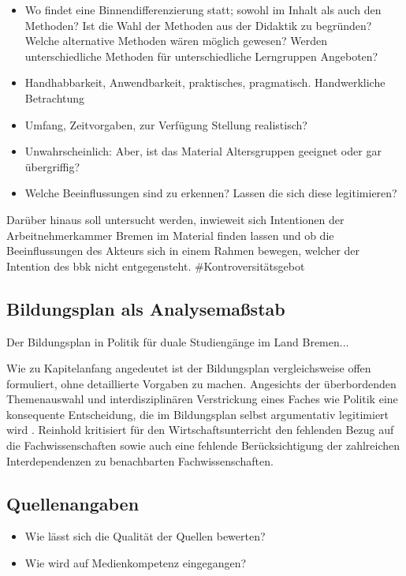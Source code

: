 \begin{itemize}
    \item Wo findet eine Binnendifferenzierung statt; sowohl im Inhalt als auch den Methoden? Ist die Wahl der Methoden aus der Didaktik zu begründen? Welche alternative Methoden wären möglich gewesen? Werden unterschiedliche Methoden für unterschiedliche Lerngruppen Angeboten?
    \item Handhabbarkeit, Anwendbarkeit, praktisches, pragmatisch. Handwerkliche Betrachtung
    \item Umfang, Zeitvorgaben, zur Verfügung Stellung realistisch?
    \item Unwahrscheinlich: Aber, ist das Material Altersgruppen geeignet oder gar übergriffig?
    \item Welche Beeinflussungen sind zu erkennen? Lassen die sich diese legitimieren?
\end{itemize}
Darüber hinaus soll untersucht werden, inwieweit sich Intentionen der Arbeitnehmerkammer Bremen im Material finden lassen und ob die Beeinflussungen des Akteurs sich in einem Rahmen bewegen, welcher der Intention des \gls{bbk} nicht entgegensteht. \#Kontroversitätsgebot 


\subsection{Bildungsplan als Analysemaßstab}
Der Bildungsplan \autocite{bplan} in Politik für duale Studiengänge im Land Bremen...

Wie zu Kapitelanfang angedeutet ist der Bildungsplan vergleichsweise offen formuliert, ohne detaillierte Vorgaben zu machen. Angesichts der überbordenden Themenauswahl und interdisziplinären Verstrickung eines Faches wie Politik eine konsequente Entscheidung, die im Bildungsplan selbst argumentativ legitimiert wird \autocite[diggah, welche Seite habe ich das gelesen]{bplan}. Reinhold \textcite[17-18]{Hedtke2016} kritisiert für den Wirtschaftsunterricht den fehlenden Bezug auf die Fachwissenschaften sowie auch eine fehlende Berücksichtigung der zahlreichen Interdependenzen zu benachbarten Fachwissenschaften. 




\subsection{Quellenangaben}
\begin{itemize}
    \item Wie lässt sich die Qualität der Quellen bewerten?
    \item Wie wird auf Medienkompetenz eingegangen?
 \end{itemize}




